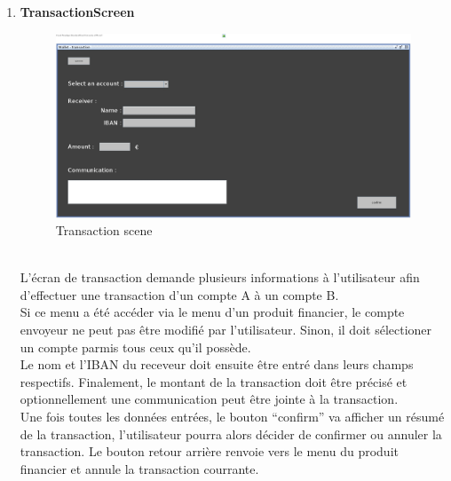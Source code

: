 \documentclass[../rapport.tex]{subfiles}
\begin{document}
\begin{enumerate}
\item \textbf{TransactionScreen}\\
		\begin{figure}[h!]
				\centering \includegraphics[scale=0.2]{ressources/photos_diagrammes/app1/gui/performTransaction.jpg}
				\caption{Transaction scene}
		\end{figure}
		\\
L'écran de transaction demande plusieurs informations à l'utilisateur afin d'effectuer une transaction d'un compte A à un compte B.\\
Si ce menu a été accéder via le menu d'un produit financier, le compte envoyeur ne peut pas être modifié par l'utilisateur. Sinon, il doit sélectioner un compte parmis tous ceux qu'il possède.\\
Le nom et l'IBAN du receveur doit ensuite être entré dans leurs champs respectifs. Finalement, le montant de la transaction doit être précisé et optionnellement une communication peut être jointe à la transaction.\\
Une fois toutes les données entrées, le bouton ``confirm'' va afficher un résumé de la transaction, l'utilisateur pourra alors décider de confirmer ou annuler la transaction.
Le bouton retour arrière renvoie vers le menu du produit financier et annule la transaction courrante.


\end{enumerate}
\end{document}
